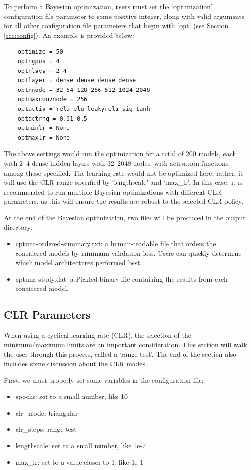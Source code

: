 \documentclass[letterpaper, 12pt]{article}
\begin{document}
\noindent To perform a Bayesian optimization, users must set the `optimization' 
configuration file parameter to some positive integer, along with valid arguments 
for all other configuration file parameters that begin with `opt' (see Section 
\ref{sec:config}).  An example is provided below:
\begin{verbatim}
	optimize = 50
	optngpus = 4
	optnlays = 2 4
	optlayer = dense dense dense dense
	optnnode = 32 64 128 256 512 1024 2048
	optmaxconvnode = 256
	optactiv = relu elu leakyrelu sig tanh
	optactrng = 0.01 0.5
	optminlr = None
	optmaxlr = None
\end{verbatim}
\noindent The above settings would run the optimization for a total of 200 models, 
each with 2--4 dense hidden layers with 32--2048 nodes, with activation functions 
among those specified.  The learning rate would not be optimized here; rather, it 
will use the CLR range specified by `lengthscale' and `max\_lr'.  In this 
case, it is recommended to run multiple Bayesian optimizations with different 
CLR parameters, as this will ensure the results are robust to the selected CLR 
policy.

\noindent At the end of the Bayesian optimization, two files will be produced 
in the output directory:
\begin{itemize}
	\item optuna-ordered-summary.txt: a human-readable file that orders the 
	         considered models by minimum validation loss.  Users can quickly 
	         determine which model architectures performed best.
    \item optuna-study.dat: a Pickled binary file containing the results from 
             each considered model.
\end{itemize}


\subsection{CLR Parameters}
\label{sec:clr}

When using a cyclical learning rate (CLR), the selection of the minimum/maximum 
limits are an important consideration.  This section will walk the user through 
this process, called a `range test'.  The end of the section also includes some 
discussion about the CLR modes.  \newline

\noindent First, we must properly set some variables in the configuration file:
\begin{itemize}
\item epochs: set to a small number, like 10
\item clr\_mode: triangular
\item clr\_steps: range test
\item lengthscale: set to a small number, like 1e-7
\item max\_lr: set to a value closer to 1, like 1e-1
\end{itemize}
\end{document}
